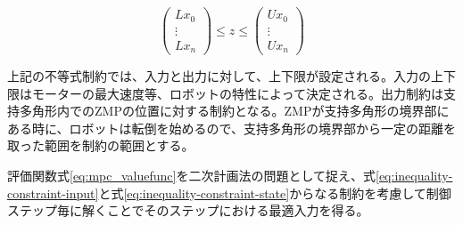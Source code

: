 \begin{equation}
  \begin{pmatrix}
    Lx_{0} \\ \vdots \\ Lx_{n}
  \end{pmatrix}
  \leq z \leq
  \begin{pmatrix}
    Ux_{0} \\ \vdots \\ Ux_{n}
  \end{pmatrix}
  \label{eq:inequality-constraint-state}
\end{equation}


上記の不等式制約では、入力と出力に対して、上下限が設定される。入力の上下限はモーターの最大速度等、ロボットの特性によって決定される。出力制約は支持多角形内でのZMPの位置に対する制約となる。ZMPが支持多角形の境界部にある時に、ロボットは転倒を始めるので、支持多角形の境界部から一定の距離を取った範囲を制約の範囲とする。

評価関数式\eqref{eq:mpc_valuefunc}を二次計画法の問題として捉え、式\eqref{eq:inequality-constraint-input}と式\eqref{eq:inequality-constraint-state}からなる制約を考慮して制御ステップ毎に解くことでそのステップにおける最適入力を得る。
